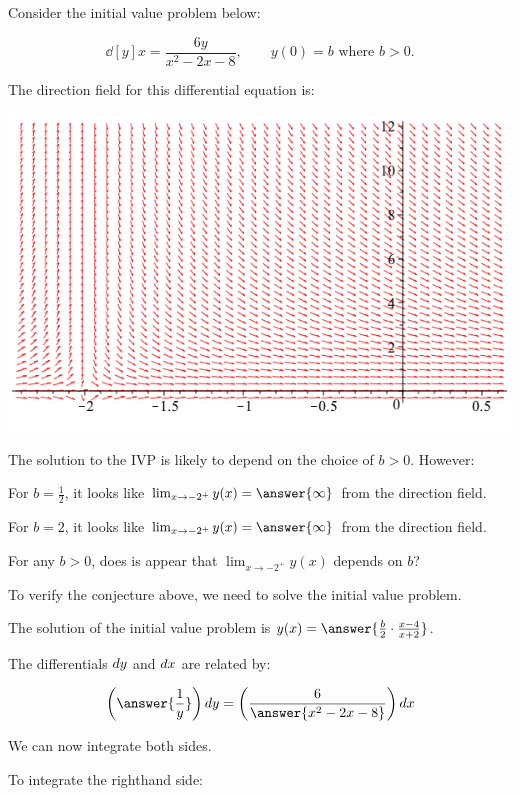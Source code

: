\documentclass{ximera}
\author{Jim Talamo}
\begin{document}
\begin{exercise}
Consider the initial value problem below:

\[
\dd[y]{x} = \frac{6y}{x^2-2x-8}  , \qquad y(0)=b \textrm{ where } b>0.
\]

The direction field for this differential equation is:

 \begin{image}
  \includegraphics[width=.5 \textwidth]{separableEquation4Image.png}
\end{image}

\begin{exercise}
The solution to the IVP is likely to depend on the choice of $b>0$.  However:

For $b=\frac{1}{2}$, it looks like $\lim_{x\to -2^+}y(x) = \answer{\infty} $ from the direction field.

For $b=2$, it looks like $\lim_{x\to -2^+} y(x) = \answer{\infty}$ from the direction field.

For any $b>0$, does is appear that $\lim_{x\to -2^+} y(x)$ depends on $b$?
\begin{multipleChoice}
\end{multipleChoice}
\end{exercise}

\begin{exercise}
To verify the conjecture above, we need to solve the initial value problem.

The solution of the initial value problem is $y(x) = \answer{ \frac{b}{2} \cdot \frac{x-4}{x+2} }$.

\begin{hint}
The differentials $\mathop{}\!d y$ and $\mathop{}\!d x$ are related by:

\[
\left(\answer{\frac{1}{y}} \right) \d y = \left(\frac{6}{\answer{x^2-2x-8} } \right) \d x
\]

\begin{question}
We can now integrate both sides.

To integrate the righthand side:

\begin{multipleChoice}
\end{multipleChoice}


\end{question}
\end{hint}
\end{exercise}
\end{exercise}
\end{document}
